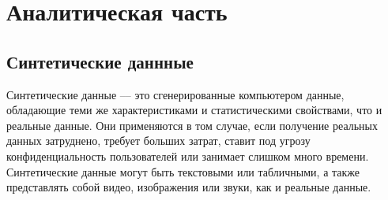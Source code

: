 \chapter{Аналитическая часть}

\section{Синтетические даннные}

Синтетические данные --– это сгенерированные компьютером данные,
обладающие теми же характеристиками и статистическими свойствами, что и
реальные данные.
Они применяются в том случае, если получение реальных данных затруднено, требует больших затрат, ставит под угрозу конфиденциальность пользователей или занимает слишком много времени.
Синтетические данные могут быть текстовыми или табличными, а
также представлять собой видео, изображения или звуки, как и реальные данные.






